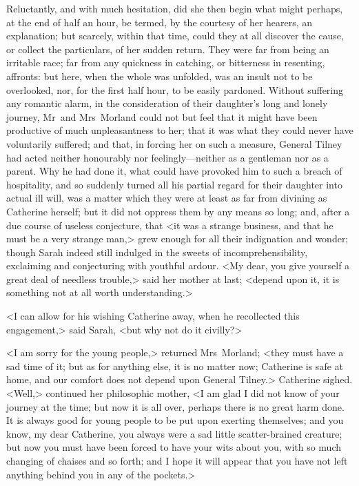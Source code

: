  Reluctantly, and with much hesitation, did she then begin what might perhaps, at the end of half an hour, be termed, by the courtesy of her hearers, an explanation; but scarcely, within that time, could they at all discover the cause, or collect the particulars, of her sudden return. They were far from being an irritable race; far from any quickness in catching, or bitterness in resenting, affronts: but here, when the whole was unfolded, was an insult not to be overlooked, nor, for the first half hour, to be easily pardoned. Without suffering any romantic alarm, in the consideration of their daughter's long and lonely journey, Mr~and Mrs~Morland could not but feel that it might have been productive of much unpleasantness to her; that it was what they could never have voluntarily suffered; and that, in forcing her on such a measure, General Tilney had acted neither honourably nor feelingly—neither as a gentleman nor as a parent. Why he had done it, what could have provoked him to such a breach of hospitality, and so suddenly turned all his partial regard for their daughter into actual ill will, was a matter which they were at least as far from divining as Catherine herself; but it did not oppress them by any means so long; and, after a due course of useless conjecture, that <it was a strange business, and that he must be a very strange man,> grew enough for all their indignation and wonder; though Sarah indeed still indulged in the sweets of incomprehensibility, exclaiming and conjecturing with youthful ardour. <My dear, you give yourself a great deal of needless trouble,> said her mother at last; <depend upon it, it is something not at all worth understanding.> 

 <I can allow for his wishing Catherine away, when he recollected this engagement,> said Sarah, <but why not do it civilly?> 

 <I am sorry for the young people,> returned Mrs~Morland; <they must have a sad time of it; but as for anything else, it is no matter now; Catherine is safe at home, and our comfort does not depend upon General Tilney.> Catherine sighed. <Well,> continued her philosophic mother, <I am glad I did not know of your journey at the time; but now it is all over, perhaps there is no great harm done. It is always good for young people to be put upon exerting themselves; and you know, my dear Catherine, you always were a sad little scatter-brained creature; but now you must have been forced to have your wits about you, with so much changing of chaises and so forth; and I hope it will appear that you have not left anything behind you in any of the pockets.> 

